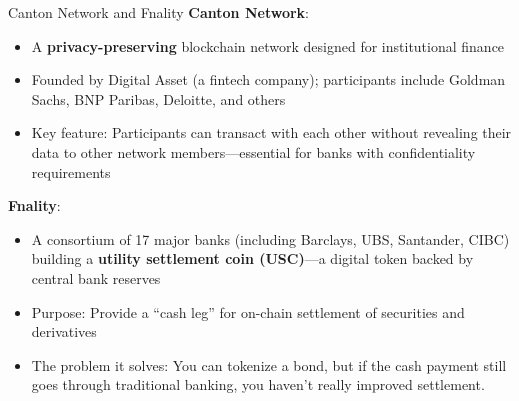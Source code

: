 \documentclass[10pt]{beamer}
\newcommand{\highlight}[1]{\textcolor{AccentOrange}{\textbf{#1}}}
\begin{document}
\begin{frame}{Canton Network and Fnality}
  \textbf{Canton Network}:
  \begin{itemize}
    \item A \highlight{privacy-preserving} blockchain network designed for institutional finance
    \item Founded by Digital Asset (a fintech company); participants include Goldman Sachs, BNP Paribas, Deloitte, and others
    \item Key feature: Participants can transact with each other without revealing their data to other network members---essential for banks with confidentiality requirements
  \end{itemize}
  
  \vspace{0.5em}
  \textbf{Fnality}:
  \begin{itemize}
    \item A consortium of 17 major banks (including Barclays, UBS, Santander, CIBC) building a \highlight{utility settlement coin (USC)}---a digital token backed by central bank reserves
    \item Purpose: Provide a ``cash leg'' for on-chain settlement of securities and derivatives
    \item The problem it solves: You can tokenize a bond, but if the cash payment still goes through traditional banking, you haven't really improved settlement.
  \end{itemize}
  
\end{frame}
\end{document}
